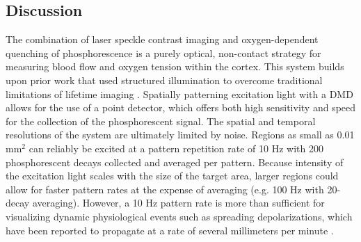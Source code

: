 \documentclass[12pt]{spieman}  %
\begin{document}
\begin{spacing}{2}
\section{Discussion}
\label{sect:discussion}

The combination of laser speckle contrast imaging and oxygen-dependent quenching of phosphorescence is a purely optical, non-contact strategy for measuring blood flow and oxygen tension within the cortex. This system builds upon prior work that used structured illumination to overcome traditional limitations of lifetime imaging \cite{Ponticorvo:2010uv}. Spatially patterning excitation light with a DMD allows for the use of a point detector, which offers both high sensitivity and speed for the collection of the phosphorescent signal. The spatial and temporal resolutions of the system are ultimately limited by noise. Regions as small as 0.01 mm$^{2}$ can reliably be excited at a pattern repetition rate of 10 Hz with 200 phosphorescent decays collected and averaged per pattern. Because intensity of the excitation light scales with the size of the target area, larger regions could allow for faster pattern rates at the expense of averaging (e.g. 100 Hz with 20-decay averaging). However, a 10 Hz pattern rate is more than sufficient for visualizing dynamic physiological events such as spreading depolarizations, which have been reported to propagate at a rate of several millimeters per minute \cite{Lauritzen:1994vs}.


\end{spacing}
\end{document}
